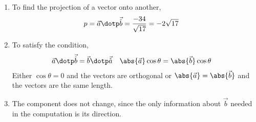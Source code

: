 \begin{enumerate}
    \item To find the projection of a vector onto another,
          \begin{align}
              p & = \vec{a} \dotp \vec{\hat{b}} = \frac{-34}{\sqrt{17}}
              = -2\sqrt{17}
          \end{align}

    \item To satisfy the condition,
          \begin{align}
              \vec{a} \dotp \vec{\hat{b}} & = \vec{b} \dotp \vec{\hat{a}} &
              \abs{\vec{a}}\cos \theta    & = \abs{\vec{b}} \cos \theta
          \end{align}
          Either $ \cos \theta = 0 $ and the vectors are orthogonal or
          $ \abs{\vec{a}} = \abs{\vec{b}} $ and the vectors are the same length.

    \item The component does not change, since the only information about $ \vec{b} $
          needed in the computation is its direction.
\end{enumerate}